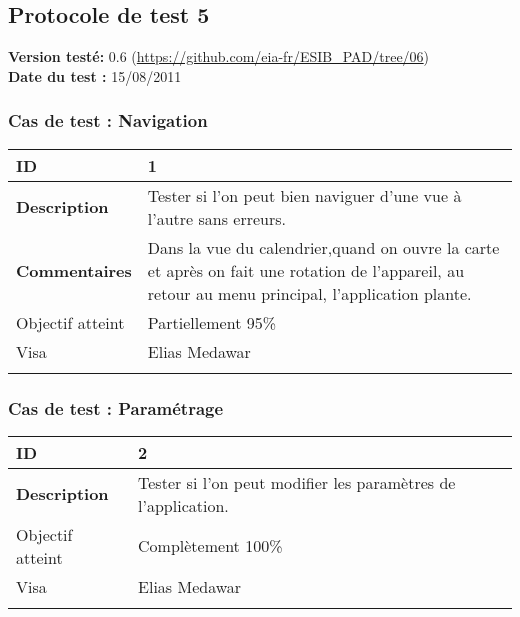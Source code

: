 		\subsection{Protocole de test 5}
		 		\textbf{Version testé:} 0.6 (\url{https://github.com/eia-fr/ESIB_PAD/tree/06}) \\
		 		\textbf{	Date du test :} 15/08/2011
		 
		 		\subsubsection*{Cas de test : Navigation}
		 				 \begin{longtable}{m{4cm}|p{10cm}|}
		 				 \textbf{ ID} & 1 \\
		 				 \hline \textbf{Description} & Tester si l'on peut bien naviguer d'une vue à l'autre sans erreurs.\\
		 				 \hline \textbf{Commentaires} & Dans la vue du calendrier,quand on ouvre la carte et après on fait une rotation de l'appareil, au retour au menu principal,  l'application plante. \\
		 				 \hline Objectif  atteint & {\color{orange} Partiellement 95\% \CheckedBox } \\
		 				\hline Visa & Elias Medawar \\	
		 				 \\
		 			 \end{longtable} 
		  		\subsubsection*{Cas de test : Paramétrage}
		 		 \begin{longtable}{m{4cm}|p{10cm}|}
		 		 \textbf{ ID} & 2 \\
		 		 \hline \textbf{Description} & Tester si l'on peut modifier les paramètres de l'application.\\
		  				\hline Objectif atteint &  {\color{green}Complètement 100\% \CheckedBox} \\
		  				\hline Visa & Elias Medawar 	\\
		 		 \\
		 		  \end{longtable} 		 		 
